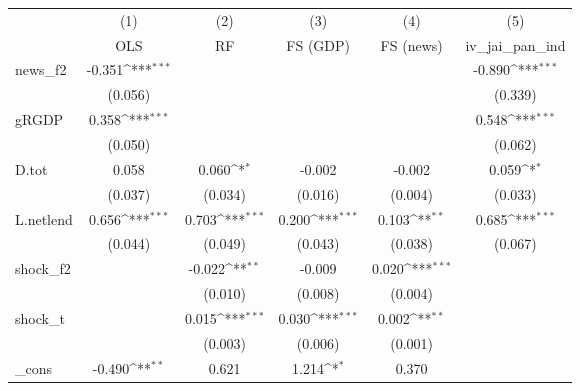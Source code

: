 {
\def\sym#1{\ifmmode^{#1}\else\(^{#1}\)\fi}
\begin{tabular}{l*{5}{c}}
\toprule
            &\multicolumn{1}{c}{(1)}&\multicolumn{1}{c}{(2)}&\multicolumn{1}{c}{(3)}&\multicolumn{1}{c}{(4)}&\multicolumn{1}{c}{(5)}\\
            &\multicolumn{1}{c}{OLS}&\multicolumn{1}{c}{RF}&\multicolumn{1}{c}{FS (GDP)}&\multicolumn{1}{c}{FS (news)}&\multicolumn{1}{c}{iv\_jai\_pan\_ind}\\
\midrule
news\_f2     &      -0.351\sym{***}&                     &                     &                     &      -0.890\sym{***}\\
            &     (0.056)         &                     &                     &                     &     (0.339)         \\
\addlinespace
gRGDP       &       0.358\sym{***}&                     &                     &                     &       0.548\sym{***}\\
            &     (0.050)         &                     &                     &                     &     (0.062)         \\
\addlinespace
D.tot       &       0.058         &       0.060\sym{*}  &      -0.002         &      -0.002         &       0.059\sym{*}  \\
            &     (0.037)         &     (0.034)         &     (0.016)         &     (0.004)         &     (0.033)         \\
\addlinespace
L.netlend   &       0.656\sym{***}&       0.703\sym{***}&       0.200\sym{***}&       0.103\sym{**} &       0.685\sym{***}\\
            &     (0.044)         &     (0.049)         &     (0.043)         &     (0.038)         &     (0.067)         \\
\addlinespace
shock\_f2    &                     &      -0.022\sym{**} &      -0.009         &       0.020\sym{***}&                     \\
            &                     &     (0.010)         &     (0.008)         &     (0.004)         &                     \\
\addlinespace
shock\_t     &                     &       0.015\sym{***}&       0.030\sym{***}&       0.002\sym{**} &                     \\
            &                     &     (0.003)         &     (0.006)         &     (0.001)         &                     \\
\addlinespace
\_cons      &      -0.490\sym{**} &       0.621         &       1.214\sym{*}  &       0.370         &                     \\

\end{tabular}}
